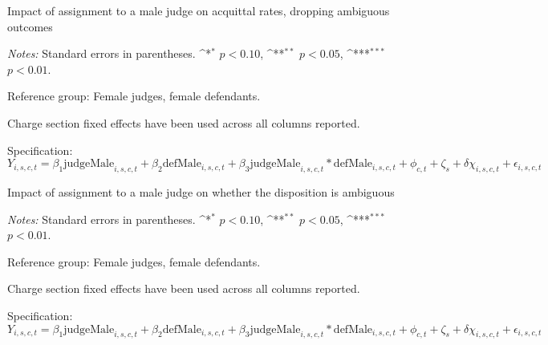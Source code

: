 \documentclass[12pt,english]{article}
\def\sym#1{\ifmmode^{#1}\else\(^{#1}\)\fi}
\begin{document}
\begin{appendices}
\begin{landscape}
\begin{table}
  \begin{center}
     \caption{Impact of assignment to a male judge on acquittal rates, dropping ambiguous outcomes}
      \label{tab:amb_random_female}
     
    \end{center}
    \begin{minipage}{1.6\textwidth}
        \footnotesize 
        \emph{Notes:} Standard errors in parentheses. \sym{*} \(p<0.10\), \sym{**} \(p<0.05\), \sym{***} \(p<0.01\).  \par 
        Reference group: Female judges, female defendants.  \par
        Charge section fixed effects have been used across all columns reported. \par
        Specification: $Y_{i,s,c,t} = \beta_{1} \text{judgeMale}_{i,s,c,t} + \beta_{2} \text{defMale}_{i,s,c,t} + \beta_{3} \text{judgeMale}_{i,s,c,t} * \text{defMale}_{i,s,c,t} + \phi_{c,t} + \zeta_{s} + \delta \chi_{i,s,c,t} + \epsilon_{i,s,c,t}$ \par
   \end{minipage}
\end{table}

\begin{table}
  \begin{center}
     \caption{Impact of assignment to a male judge on whether the disposition is ambiguous}
      \label{tab:robust_amb_female}
     
    \end{center}
    \begin{minipage}{1.6\textwidth}
        \footnotesize 
        \emph{Notes:} Standard errors in parentheses. \sym{*} \(p<0.10\), \sym{**} \(p<0.05\), \sym{***} \(p<0.01\).  \par 
        Reference group: Female judges, female defendants.  \par
        Charge section fixed effects have been used across all columns reported. \par
        Specification: $Y_{i,s,c,t} = \beta_{1} \text{judgeMale}_{i,s,c,t} + \beta_{2} \text{defMale}_{i,s,c,t} + \beta_{3} \text{judgeMale}_{i,s,c,t} * \text{defMale}_{i,s,c,t} + \phi_{c,t} + \zeta_{s} + \delta \chi_{i,s,c,t} + \epsilon_{i,s,c,t}$ \par
   \end{minipage}
\end{table}


\end{landscape}
\end{appendices}
\end{document}
